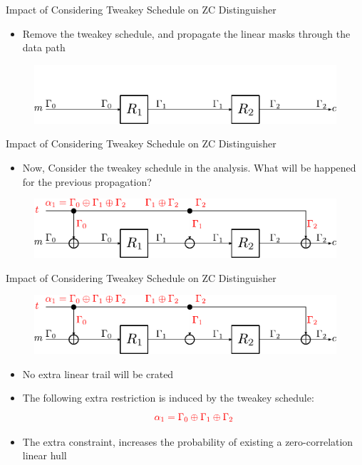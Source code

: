\documentclass{beamer}
\begin{document}
\begin{frame}{Impact of Considering Tweakey Schedule on ZC Distinguisher}
\begin{itemize}
    \item Remove the tweakey schedule, and propagate the linear masks through the data path
\end{itemize}
\begin{figure}
\includegraphics[scale=0.7]{./Images/impact_of_tk_1.pdf}
\centering
\end{figure}
\end{frame}

\begin{frame}{Impact of Considering Tweakey Schedule on ZC Distinguisher}
\begin{itemize}
    \item Now, Consider the tweakey schedule in the analysis. What will be happened for the previous propagation?
\end{itemize}
\begin{figure}
\includegraphics[scale=0.7]{./Images/impact_of_tk_2.pdf}
\centering
\end{figure}
\end{frame}

\begin{frame}{Impact of Considering Tweakey Schedule on ZC Distinguisher}
\begin{figure}
\includegraphics[scale=0.7]{./Images/impact_of_tk_2.pdf}
\centering
\end{figure}
\begin{itemize}
    \item No extra linear trail will be crated
    \item The following extra restriction is induced by the tweakey schedule: 
    \[
    \textcolor{red}{\alpha_{1} = \Gamma_{0} \oplus \Gamma_{1}\oplus \Gamma_{2}}
    \]
    \item The extra constraint, increases the probability of existing a zero-correlation linear hull \cite{Tweakable-Zero-Correlation}
\end{itemize}
\end{frame}
\end{document}
